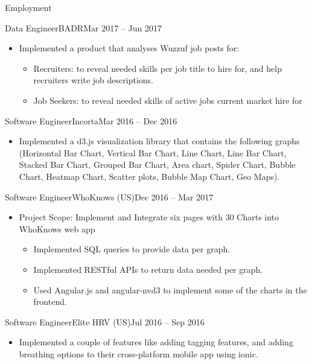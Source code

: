 \documentclass[]{ahmedamrcv}
\begin{document}
\begin{cvsection}{Employment}
		\begin{cvsubsection}{Data Engineer}{BADR}{Mar 2017 -- Jun 2017}
			\begin{itemize}
				\item Implemented a product that analyses Wuzzuf job posts for:
				\begin{itemize}
					\item Recruiters: to reveal needed skills per job title to hire for, and help recruiters write job descriptions.
					\item Job Seekers: to reveal needed skills of active jobs current market hire for
				\end{itemize}
			\end{itemize}
		\end{cvsubsection}

		\begin{cvsubsection}{Software Engineer}{Incorta}{Mar 2016 -- Dec 2016}
			\begin{itemize}
				\item Implemented a d3.js visualization library that contains the following graphs (Horizontal Bar Chart, Vertical Bar Chart, Line Chart, Line Bar Chart, Stacked Bar Chart, Grouped Bar Chart, Area chart, Spider Chart, Bubble Chart, Heatmap Chart, Scatter plots, Bubble Map Chart, Geo Maps).
			\end{itemize}
		\end{cvsubsection}


		\begin{cvsubsection}{Software Engineer}{WhoKnows (US)}{Dec 2016 -- Mar 2017}
			\begin{itemize}
				\item Project Scope: Implement and Integrate six pages with 30 Charts into WhoKnows web app
				\begin{itemize}
					\item Implemented SQL queries to provide data per graph.
					\item Implemented RESTful APIs to return data needed per graph.
					\item Used Angular.js and angular-nvd3 to implement some of the charts in the frontend.
				\end{itemize}
				
			\end{itemize}
		\end{cvsubsection}

		\begin{cvsubsection}{Software Engineer}{Elite HRV (US)}{Jul 2016 -- Sep 2016}
			\begin{itemize}
				\item Implemented a couple of features like adding tagging features, and adding breathing options to their cross-platform mobile app using ionic.
			\end{itemize}
		\end{cvsubsection}

	\end{cvsection}
	
\end{document}
